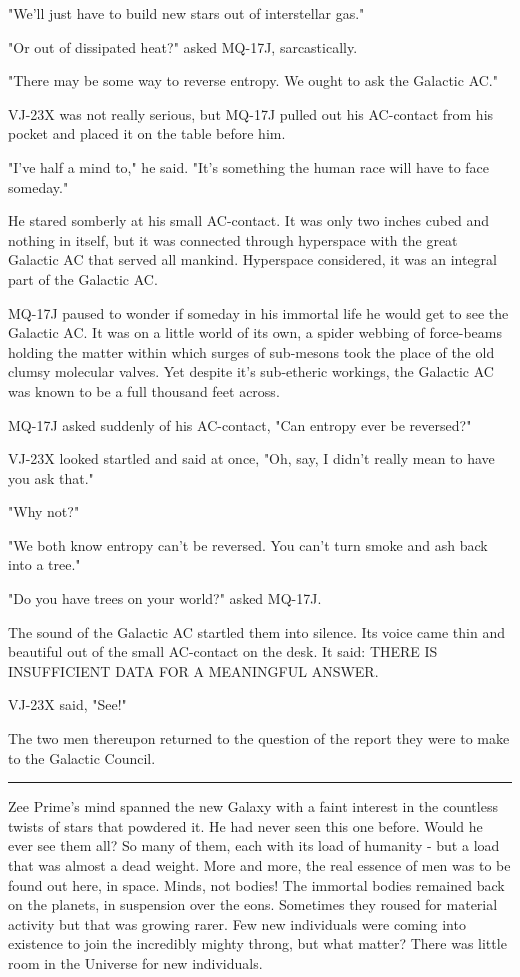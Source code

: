 \documentclass[11pt]{article}
\newcommand{\sep}[0]{\vspace{.5cm}\hrule\vspace{.5cm}}
\begin{document}
"We'll just have to build new stars out of interstellar gas."

"Or out of dissipated heat?" asked MQ-17J, sarcastically.

"There may be some way to reverse entropy. We ought to ask the Galactic AC."

VJ-23X was not really serious, but MQ-17J pulled out his AC-contact from his pocket and placed it on the table before him.

"I've half a mind to," he said. "It's something the human race will have to face someday."

He stared somberly at his small AC-contact. It was only two inches cubed and nothing in itself, but it was connected through hyperspace with the great Galactic AC that served all mankind. Hyperspace considered, it was an integral part of the Galactic AC.

MQ-17J paused to wonder if someday in his immortal life he would get to see the Galactic AC. It was on a little world of its own, a spider webbing of force-beams holding the matter within which surges of sub-mesons took the place of the old clumsy molecular valves. Yet despite it's sub-etheric workings, the Galactic AC was known to be a full thousand feet across.

MQ-17J asked suddenly of his AC-contact, "Can entropy ever be reversed?"

VJ-23X looked startled and said at once, "Oh, say, I didn't really mean to have you ask that."

"Why not?"

"We both know entropy can't be reversed. You can't turn smoke and ash back into a tree."

"Do you have trees on your world?" asked MQ-17J.

The sound of the Galactic AC startled them into silence. Its voice came thin and beautiful out of the small AC-contact on the desk. It said: THERE IS INSUFFICIENT DATA FOR A MEANINGFUL ANSWER.

VJ-23X said, "See!"

The two men thereupon returned to the question of the report they were to make to the Galactic Council.

\sep{}

Zee Prime's mind spanned the new Galaxy with a faint interest in the countless twists of stars that powdered it. He had never seen this one before. Would he ever see them all? So many of them, each with its load of humanity - but a load that was almost a dead weight. More and more, the real essence of men was to be found out here, in space.
Minds, not bodies! The immortal bodies remained back on the planets, in suspension over the eons. Sometimes they roused for material activity but that was growing rarer. Few new individuals were coming into existence to join the incredibly mighty throng, but what matter? There was little room in the Universe for new individuals.
\end{document}
